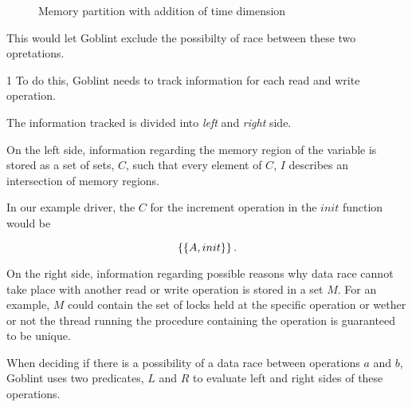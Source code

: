 \documentclass[..thesis.tex]{subfiles}
\begin{document}
\begin{figure}[H]
    \caption{Memory partition with addition of time dimension}
\end{figure}

This would let Goblint exclude the possibilty of race between these two opretations. 

1
To do this, Goblint needs to track information for each read and write operation.


The information tracked is divided into \textit{left} and \textit{right} side. 

On the left side, information regarding the memory region of the variable is stored as a set of sets, $C$, such that every element of $C$, $I$ describes an intersection of memory regions.

In our example driver, the $C$ for the increment operation in the $init$ function would be 

\begin{equation*}
\left\lbrace \left\lbrace A, init \right\rbrace \right\rbrace \text{.}
\end{equation*} 

On the right side, information regarding possible reasons why data race cannot take place with another read or write operation is stored in a set $M$. For an example, $M$ could contain the set of locks held at the specific operation or wether or not the thread running the procedure containing the operation is guaranteed to be unique.

When deciding if there is a possibility of a data race between operations $a$ and $b$, Goblint uses two predicates, $L$ and $R$ to evaluate left and right sides of these operations. 
\end{document}
